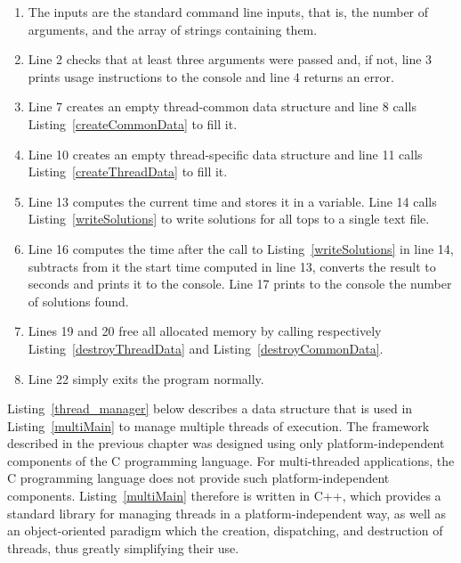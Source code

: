 \begin{enumerate}
\item The inputs are the standard command line inputs, that is, the number of arguments, and the array of strings containing them.
\item Line 2 checks that at least three arguments were passed and, if not, line 3 prints usage instructions to the console and line 4 returns an error.
\addtocounter{enumi}{4}
\item Line 7 creates an empty thread-common data structure and line 8 calls Listing~\ref{createCommonData} to fill it.
\addtocounter{enumi}{2}
\item Line 10 creates an empty thread-specific data structure and line 11 calls Listing~\ref{createThreadData} to fill it.
\addtocounter{enumi}{2}
\item Line 13 computes the current time and stores it in a variable. Line 14 calls Listing~\ref{writeSolutions} to write solutions for all tops to a single text file.
\addtocounter{enumi}{2}
\item Line 16 computes the time after the call to Listing~\ref{writeSolutions} in line 14, subtracts from it the start time computed in line 13, converts the result to seconds and prints it to the console. Line 17 prints to the console the number of solutions found.
\addtocounter{enumi}{2}
\item Lines 19 and 20 free all allocated memory by calling respectively Listing~\ref{destroyThreadData} and Listing~\ref{destroyCommonData}.
\addtocounter{enumi}{2}
\item Line 22 simply exits the program normally.
\end{enumerate}


Listing~\ref{thread_manager} below describes a data structure that is used in Listing~\ref{multiMain} to manage multiple threads of execution. The framework described in the previous chapter was designed using only platform-independent components of the C programming language. For multi-threaded applications, the C programming language does not provide such platform-independent components. Listing~\ref{multiMain} therefore is written in C++, which provides a standard library for managing threads in a platform-independent way, as well as an object-oriented paradigm which the creation, dispatching, and destruction of threads, thus greatly simplifying their use.

